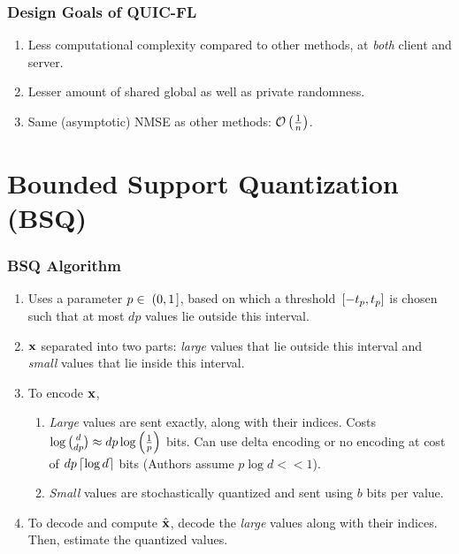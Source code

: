 \documentclass{beamer}
\begin{document}
    \begin{frame}
        \frametitle{Design Goals of QUIC-FL}
        \begin{enumerate}
            \item Less computational complexity compared to other methods, at
            \emph{both} client and server.
            \item Lesser amount of shared global as well as private randomness.
            \item Same (asymptotic) NMSE as other methods: \(\mathcal O\left(\frac{1}{n}\right)\).
        \end{enumerate}
    \end{frame}

    \section{Bounded Support Quantization (BSQ)}
    \begin{frame}
        \frametitle{BSQ Algorithm}
        \begin{enumerate}
            \item Uses a parameter \(p\in{}\left.\left(0,1\right.\right]\), based on which 
            a threshold  \({}\left[-t_p,t_p\right]\) is chosen such that at most \(dp\)
            values lie outside this interval.
            \item \(\boldsymbol{\mathbf{x}}\) separated into two parts: \emph{large}
            values that lie outside this interval and \emph{small} values
            that lie inside this interval.
            \item To encode \(\boldsymbol{\mathbf{x}}\),
            \begin{enumerate}
                \item \emph{Large} values are sent exactly, along with their
                indices. Costs \(\log\binom{d}{dp} \approx 
                dp\log\left(\frac{1}{p}\right)\) bits. Can use delta encoding or
                no encoding at cost of \(dp\left\lceil\log d\right\rceil\) bits (Authors assume
                \(p\log d << 1\)).
                \item \emph{Small} values are stochastically quantized and
                sent using \(b\) bits per value.
            \end{enumerate}
            \item To decode and compute \(\hat{\boldsymbol{\mathbf{x}}}\), decode the \emph{large}
            values along with their indices. Then, estimate the quantized values.
        \end{enumerate}
    \end{frame}
\end{document}
